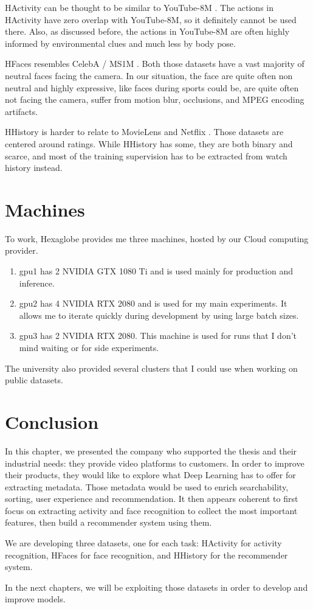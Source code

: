 HActivity can be thought to be similar to YouTube-8M \citep{youtube8m}. The actions in HActivity have zero overlap with YouTube-8M, so it definitely cannot be used there. Also, as discussed before, the actions in YouTube-8M are often highly informed by environmental clues and much less by body pose.

HFaces resembles CelebA \citep{celeba} / MS1M \citep{celeb1m}. Both those datasets have a vast majority of neutral faces facing the camera. In our situation, the face are quite often non neutral and highly expressive, like faces during sports could be, are quite often not facing the camera, suffer from motion blur, occlusions, and MPEG encoding artifacts.

HHistory is harder to relate to MovieLens \citep{movielens} and Netflix \citep{netflix}. Those datasets are centered around ratings. While HHistory has some, they are both binary and scarce, and most of the training supervision has to be extracted from watch history instead.

\section{Machines}

To work, Hexaglobe provides me three machines, hosted by our Cloud computing provider.

\begin{enumerate}
    \item gpu1 has 2 NVIDIA GTX 1080 Ti and is used mainly for production and inference.
    \item gpu2 has 4 NVIDIA RTX 2080 and is used for my main experiments. It allows me to iterate quickly during development by using large batch sizes.
    \item gpu3 has 2 NVIDIA RTX 2080. This machine is used for runs that I don't mind waiting or for side experiments.
\end{enumerate}

The university also provided several clusters that I could use when working on public datasets.

\section{Conclusion}
In this chapter, we presented the company who supported the thesis and their industrial needs: they provide video platforms to customers. In order to improve their products, they would like to explore what Deep Learning has to offer for extracting metadata. Those metadata would be used to enrich searchability, sorting, user experience and recommendation. It then appears coherent to first focus on extracting activity and face recognition to collect the most important features, then build a recommender system using them.

We are developing three datasets, one for each task: HActivity for activity recognition, HFaces for face recognition, and HHistory for the recommender system.

In the next chapters, we will be exploiting those datasets in order to develop and improve models.